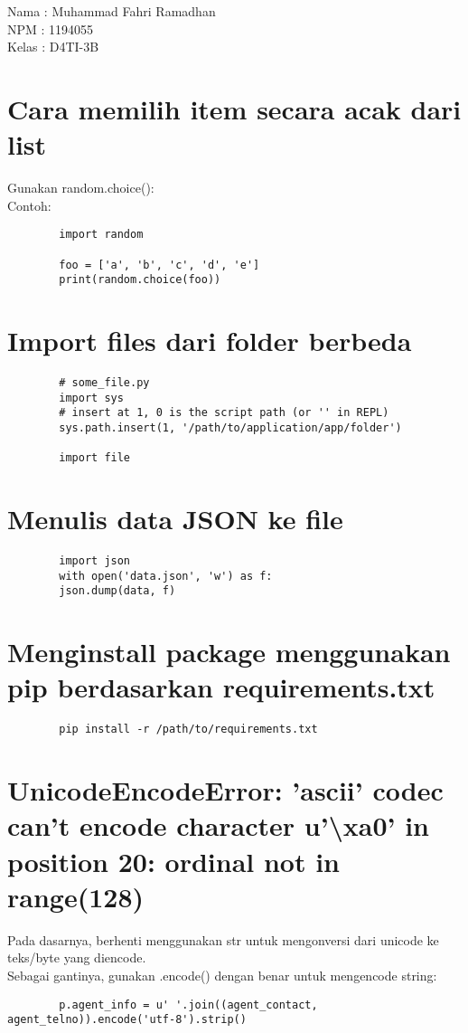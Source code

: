\documentclass{article}
\begin{document}
Nama	: Muhammad Fahri Ramadhan \\
NPM		: 1194055 \\
Kelas	: D4TI-3B \\
	
	\section {Cara memilih item secara acak dari list}
	Gunakan random.choice(): \\
	Contoh:
	\begin{lstlisting}
		import random
		
		foo = ['a', 'b', 'c', 'd', 'e']
		print(random.choice(foo))
	\end{lstlisting}
	
	\section {Import files dari folder berbeda}
	\begin{lstlisting}
		# some_file.py
		import sys
		# insert at 1, 0 is the script path (or '' in REPL)
		sys.path.insert(1, '/path/to/application/app/folder')
		
		import file
	\end{lstlisting}

	\section {Menulis data JSON ke file}
	\begin{lstlisting}
		import json
		with open('data.json', 'w') as f:
		json.dump(data, f)
	\end{lstlisting}

	\section {Menginstall package menggunakan pip berdasarkan requirements.txt}
	\begin{lstlisting}
		pip install -r /path/to/requirements.txt
	\end{lstlisting}

	\section {UnicodeEncodeError: 'ascii' codec can't encode character u'\textbackslash xa0' in position 20: ordinal not in range(128)}
	Pada dasarnya, berhenti menggunakan str untuk mengonversi dari unicode ke teks/byte yang diencode. \\
	Sebagai gantinya, gunakan .encode() dengan benar untuk mengencode string:
	\begin{lstlisting}
		p.agent_info = u' '.join((agent_contact, agent_telno)).encode('utf-8').strip()
	\end{lstlisting}
\end{document}
